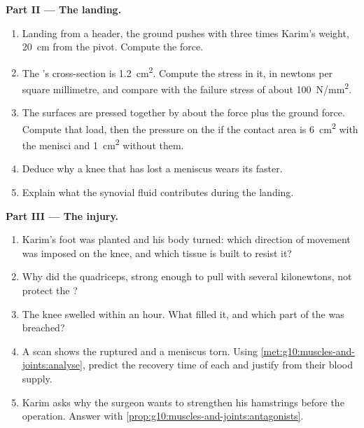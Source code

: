 \begin{problem}
\medskip
\noindent\textbf{Part II --- The landing.}
\begin{enumerate}[resume]
  \item Landing from a header, the ground pushes with three times
        Karim's weight, \qty{20}{cm} from the pivot. Compute the
         force.
  \item The 's cross-section is \qty{1.2}{cm^2}. Compute the
        stress in it, in newtons per square millimetre, and compare
        with the failure stress of about \qty{100}{N/mm^2}.
  \item The  surfaces are pressed together by about the 
        force plus the ground force. Compute that load, then the
        pressure on the  if the contact area is \qty{6}{cm^2}
        with the menisci and \qty{1}{cm^2} without them.
  \item Deduce why a knee that has lost a meniscus wears its 
        faster.
  \item Explain what the synovial fluid contributes during the
        landing.
\end{enumerate}

\medskip
\noindent\textbf{Part III --- The injury.}
\begin{enumerate}[resume]
  \item Karim's foot was planted and his body turned: which
        direction of movement was imposed on the knee, and which
        tissue is built to resist it?
  \item Why did the quadriceps, strong enough to pull with several
        kilonewtons, not protect the ?
  \item The knee swelled within an hour. What filled it, and which
        part of the  was breached?
  \item A scan shows the  ruptured and a meniscus torn. Using
        \cref{met:g10:muscles-and-joints:analyse}, predict the
        recovery time of each and justify from their blood supply.
  \item Karim asks why the surgeon wants to strengthen his hamstrings
        before the operation. Answer with
        \cref{prop:g10:muscles-and-joints:antagonists}.
\end{enumerate}


\end{problem}
